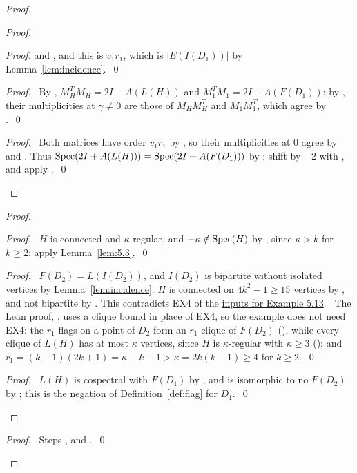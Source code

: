 \begin{proof}
\begin{proof}
\begin{proof}
    and , and this is
   $v_1r_1$, which is $|E(I(D_1))|$ by Lemma~\ref{lem:incidence}.~\qed\end{proof}
  \begin{proof}\pf\ By , $M_H^TM_H=2I+A(L(H))$ and $M_1^TM_1=2I+A(F(D_1))$; by
   , their multiplicities at $\gamma\ne0$ are those of $M_HM_H^T$ and
   $M_1M_1^T$, which agree by .~\qed\end{proof}
  \qedstep
  \begin{proof}\pf\ Both matrices have order $v_1r_1$ by , so their
   multiplicities at $0$ agree by  and . Thus
   $\mathop{\mathrm{Spec}}\nolimits(2I+A(L(H)))=\mathop{\mathrm{Spec}}\nolimits(2I+A(F(D_1)))$ by ; shift by $-2$ with
   , and apply .~\qed\end{proof}
 \end{proof}
 \begin{proof}
  \begin{proof}\pf\ $H$ is connected and $\kappa$-regular, and $-\kappa\notin\mathop{\mathrm{Spec}}\nolimits(H)$ by
   , since $\kappa>k$ for $k\ge2$; apply Lemma~\ref{lem:5.3}.~\qed\end{proof}
  \begin{proof}\pf\ $F(D_2)=L(I(D_2))$, and $I(D_2)$ is bipartite without isolated vertices by
   Lemma~\ref{lem:incidence}. $H$ is connected on $4k^2-1\ge15$ vertices by ,
   and not bipartite by . This contradicts EX4 of the
   \hyperref[input:ex513]{inputs for Example 5.13}. \new\ The Lean proof,
   , uses a clique bound in place of
   EX4, so the example does not need EX4: the $r_1$ flags on a point of $D_2$ form an
   $r_1$-clique of $F(D_2)$ (), while
   every clique of $L(H)$ has at most $\kappa$ vertices, since $H$ is $\kappa$-regular with
   $\kappa\ge3$ (); and
   $r_1=(k-1)(2k+1)=\kappa+k-1>\kappa=2k(k-1)\ge4$ for $k\ge2$.~\qed\end{proof}
  \qedstep
  \begin{proof}\pf\ $L(H)$ is cospectral with $F(D_1)$ by , and is isomorphic
   to no $F(D_2)$ by ; this is the negation of Definition~\ref{def:flag}
   for $D_1$.~\qed\end{proof}
 \end{proof}
 \qedstep
 \begin{proof}\pf\ Steps ,  and .~\qed\end{proof}
\end{proof}

